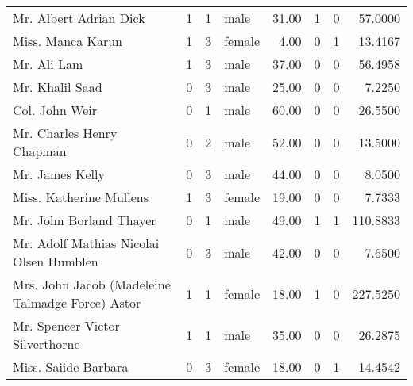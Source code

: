 \begin{tabular}{lrrlrrrr}
Mr. Albert Adrian Dick                             &         1 &       1 &    male &  31.00 &                        1 &                        0 &   57.0000 \\
Miss. Manca Karun                                  &         1 &       3 &  female &   4.00 &                        0 &                        1 &   13.4167 \\
Mr. Ali Lam                                        &         1 &       3 &    male &  37.00 &                        0 &                        0 &   56.4958 \\
Mr. Khalil Saad                                    &         0 &       3 &    male &  25.00 &                        0 &                        0 &    7.2250 \\
Col. John Weir                                     &         0 &       1 &    male &  60.00 &                        0 &                        0 &   26.5500 \\
Mr. Charles Henry Chapman                          &         0 &       2 &    male &  52.00 &                        0 &                        0 &   13.5000 \\
Mr. James Kelly                                    &         0 &       3 &    male &  44.00 &                        0 &                        0 &    8.0500 \\
Miss. Katherine Mullens                            &         1 &       3 &  female &  19.00 &                        0 &                        0 &    7.7333 \\
Mr. John Borland Thayer                            &         0 &       1 &    male &  49.00 &                        1 &                        1 &  110.8833 \\
Mr. Adolf Mathias Nicolai Olsen Humblen            &         0 &       3 &    male &  42.00 &                        0 &                        0 &    7.6500 \\
Mrs. John Jacob (Madeleine Talmadge Force) Astor   &         1 &       1 &  female &  18.00 &                        1 &                        0 &  227.5250 \\
Mr. Spencer Victor Silverthorne                    &         1 &       1 &    male &  35.00 &                        0 &                        0 &   26.2875 \\
Miss. Saiide Barbara                               &         0 &       3 &  female &  18.00 &                        0 &                        1 &   14.4542 \\

\end{tabular}
